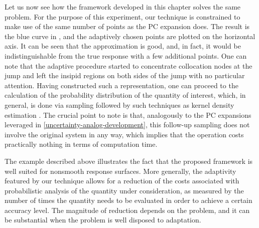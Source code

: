 Let us now see how the framework developed in this chapter solves the same
problem. For the purpose of this experiment, our technique is constrained to
make use of the same number of points as the \ac{PC} expansion does. The result
is the blue curve in , and the adaptively chosen points
are plotted on the horizontal axis. It can be seen that the approximation is
good, and, in fact, it would be indistinguishable from the true response with a
few additional points. One can note that the adaptive procedure started to
concentrate collocation nodes at the jump and left the insipid regions on both
sides of the jump with no particular attention. Having constructed such a
representation, one can proceed to the calculation of the probability
distribution of the quantity of interest, which, in general, is done via
sampling followed by such techniques as kernel density estimation
\cite{hastie2013}. The crucial point to note is that, analogously to the \ac{PC}
expansions leveraged in \cref{uncertainty-analog-development}, this follow-up
sampling does not involve the original system in any way, which implies that the
operation costs practically nothing in terms of computation time.

The example described above illustrates the fact that the proposed framework is
well suited for nonsmooth response surfaces. More generally, the adaptivity
featured by our technique allows for a reduction of the costs associated with
probabilistic analysis of the quantity under consideration, as measured by the
number of times the quantity needs to be evaluated in order to achieve a certain
accuracy level. The magnitude of reduction depends on the problem, and it can be
substantial when the problem is well disposed to adaptation.
